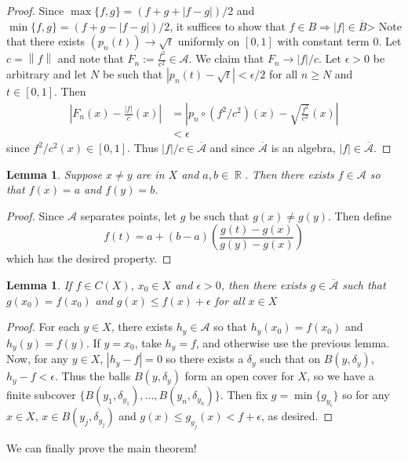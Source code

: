 \documentclass[12pt, a4paper]{book}
\DeclareMathOperator{\R}{\mathbb{R}}
\newcommand{\norm}[1]{\left\lVert#1\right\rVert} %
\newtheorem{lemma}[theorem]{Lemma}
\theoremstyle{nonumberplain}
\newtheorem{proof}{Proof}
\begin{document}
\begin{proof}
    Since $\max\{f,g\}=(f+g+|f-g|)/2$ and $\min\{f,g\}=(f+g-|f-g|)/2$, it suffices to show that $f\in B\Rightarrow |f|\in\overline{B}$>
    Note that there exists $(p_n(t))\to\sqrt{t}$ uniformly on $[0,1]$ with constant term $0$.
    Let $c=\norm{f}$ and note that $F_n:=\frac{f^2}{c^2}\in\mathcal{A}$.
    We claim that $F_n\to |f|/c$.
    Let $\epsilon>0$ be arbitrary and let $N$ be such that $|p_n(t)-\sqrt{t}|<\epsilon/2$ for all $n\geq N$ and $t\in[0,1]$.
    Then
    \begin{align*}
        \left\lvert F_n(x)-\frac{|f|}{c}(x)\right\rvert &= \left\lvert p_n\circ (f^2/c^2)(x)-\sqrt{\frac{f^2}{c^2}}(x)\right\rvert\\
                                                        &<\epsilon
    \end{align*}
    since $f^2/c^2(x)\in[0,1]$.
    Thus $|f|/c\in\overline{\mathcal{A}}$ and since $\overline{\mathcal{A}}$ is an algebra, $|f|\in\overline{\mathcal{A}}$.
\end{proof}
\begin{lemma}
    Suppose $x\neq y$ are in $X$ and $a,b\in\R$.
    Then there exists $f\in\mathcal{A}$ so that $f(x)=a$ and $f(y)=b$.
\end{lemma}
\begin{proof}
    Since $\mathcal{A}$ separates points, let $g$ be such that $g(x)\neq g(y)$.
    Then define
    \[f(t)=a+(b-a)\left(\frac{g(t)-g(x)}{g(y)-g(x)}\right)\]
    which has the desired property.
\end{proof}
\begin{lemma}
    If $f\in C(X)$, $x_0\in X$ and $\epsilon>0$, then there exists $g\in\overline{\mathcal{A}}$ such that $g(x_0)=f(x_0)$ and $g(x)\leq f(x)+\epsilon$ for all $x\in X$
\end{lemma}
\begin{proof}
    For each $y\in X$, there exists $h_y\in \mathcal{A}$ so that $h_y(x_0)=f(x_0)$ and $h_y(y)=f(y)$.
    If $y=x_0$, take $h_y=f$, and otherwise use the previous lemma.
    Now, for any $y\in X$, $|h_y-f|=0$ so there exists a $\delta_y$ such that on $B(y,\delta_y)$, $h_y-f<\epsilon$.
    Thus the balls $B(y,\delta_y)$ form an open cover for $X$, so we have a finite subcover $\{B(y_1,\delta_{y_1}),\ldots,B(y_n,\delta_{y_n})\}$.
    Then fix $g=\min\{g_{y_i}\}$ so for any $x\in X$, $x\in B(y_j,\delta_{y_j})$ and $g(x)\leq g_{y_j}(x)<f+\epsilon$, as desired.
\end{proof}
We can finally prove the main theorem!
\end{document}
